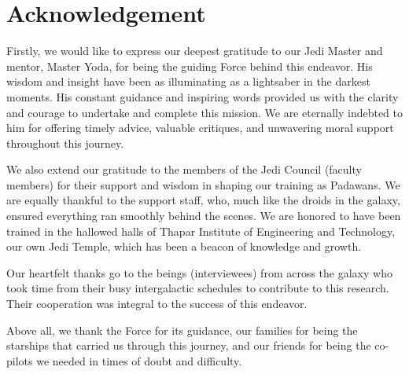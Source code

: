 
\chapter*{Acknowledgement}                                           %
\label{chap:ack}                                         %

\noindent Firstly, we would like to express our deepest gratitude to our Jedi Master and mentor, Master Yoda, for being the guiding Force behind this endeavor. His wisdom and insight have been as illuminating as a lightsaber in the darkest moments. His constant guidance and inspiring words provided us with the clarity and courage to undertake and complete this mission. We are eternally indebted to him for offering timely advice, valuable critiques, and unwavering moral support throughout this journey.

We also extend our gratitude to the members of the Jedi Council (faculty members) for their support and wisdom in shaping our training as Padawans. We are equally thankful to the support staff, who, much like the droids in the galaxy, ensured everything ran smoothly behind the scenes. We are honored to have been trained in the hallowed halls of Thapar Institute of Engineering and Technology, our own Jedi Temple, which has been a beacon of knowledge and growth.

Our heartfelt thanks go to the beings (interviewees) from across the galaxy who took time from their busy intergalactic schedules to contribute to this research. Their cooperation was integral to the success of this endeavor.

Above all, we thank the Force for its guidance, our families for being the starships that carried us through this journey, and our friends for being the co-pilots we needed in times of doubt and difficulty.

\cleardoublepage
